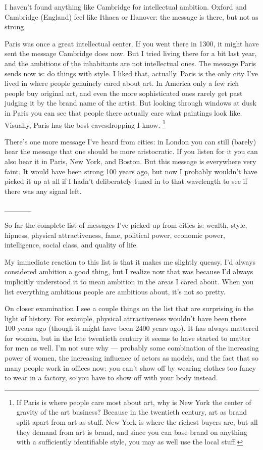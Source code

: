 \documentclass[12pt]{book}
\begin{document}
I haven't found anything like Cambridge for intellectual ambition.
Oxford and Cambridge (England) feel like Ithaca or Hanover: the message
is there, but not as strong.

Paris was once a great intellectual center. If you went there in 1300,
it might have sent the message Cambridge does now. But I tried living
there for a bit last year, and the ambitions of the inhabitants are not
intellectual ones. The message Paris sends now is: do things with style.
I liked that, actually. Paris is the only city I've lived in where
people genuinely cared about art. In America only a few rich people buy
original art, and even the more sophisticated ones rarely get past
judging it by the brand name of the artist. But looking through windows
at dusk in Paris you can see that people there actually care what
paintings look like. Visually, Paris has the best eavesdropping I know.
\footnote{If Paris is where people care most about art, why is New York
the center of gravity of the art business? Because in the twentieth
century, art as brand split apart from art as stuff. New York is where
the richest buyers are, but all they demand from art is brand, and since
you can base brand on anything with a sufficiently identifiable style,
you may as well use the local stuff.}

There's one more message I've heard from cities: in London you can still
(barely) hear the message that one should be more aristocratic. If you
listen for it you can also hear it in Paris, New York, and Boston. But
this message is everywhere very faint. It would have been strong 100
years ago, but now I probably wouldn't have picked it up at all if I
hadn't deliberately tuned in to that wavelength to see if there was any
signal left.

\_\_\_\_\_

So far the complete list of messages I've picked up from cities is:
wealth, style, hipness, physical attractiveness, fame, political power,
economic power, intelligence, social class, and quality of life.

My immediate reaction to this list is that it makes me slightly queasy.
I'd always considered ambition a good thing, but I realize now that was
because I'd always implicitly understood it to mean ambition in the
areas I cared about. When you list everything ambitious people are
ambitious about, it's not so pretty.

On closer examination I see a couple things on the list that are
surprising in the light of history. For example, physical attractiveness
wouldn't have been there 100 years ago (though it might have been 2400
years ago). It has always mattered for women, but in the late twentieth
century it seems to have started to matter for men as well. I'm not sure
why --- probably some combination of the increasing power of women, the
increasing influence of actors as models, and the fact that so many
people work in offices now: you can't show off by wearing clothes too
fancy to wear in a factory, so you have to show off with your body
instead.
\end{document}

